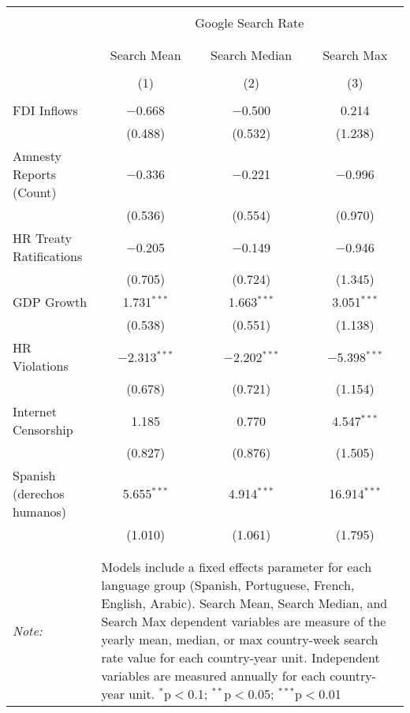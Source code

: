 
\begin{table}[!htbp] \centering 
  \caption{} 
  \label{} 
\begin{tabular}{@{\extracolsep{5pt}}lccc} 
\\[-1.8ex]\hline 
\hline \\[-1.8ex] 
 & \multicolumn{3}{c}{Google Search Rate} \\ 
\cline{2-4} 
\\[-1.8ex] & \multicolumn{3}{c}{ } \\ 
 & Search Mean & Search Median & Search Max \\ 
\\[-1.8ex] & (1) & (2) & (3)\\ 
\hline \\[-1.8ex] 
 FDI Inflows & $-$0.668 & $-$0.500 & 0.214 \\ 
  & (0.488) & (0.532) & (1.238) \\ 
  Amnesty Reports (Count) & $-$0.336 & $-$0.221 & $-$0.996 \\ 
  & (0.536) & (0.554) & (0.970) \\ 
  HR Treaty Ratifications & $-$0.205 & $-$0.149 & $-$0.946 \\ 
  & (0.705) & (0.724) & (1.345) \\ 
  GDP Growth & 1.731$^{***}$ & 1.663$^{***}$ & 3.051$^{***}$ \\ 
  & (0.538) & (0.551) & (1.138) \\ 
  HR Violations & $-$2.313$^{***}$ & $-$2.202$^{***}$ & $-$5.398$^{***}$ \\ 
  & (0.678) & (0.721) & (1.154) \\ 
  Internet Censorship & 1.185 & 0.770 & 4.547$^{***}$ \\ 
  & (0.827) & (0.876) & (1.505) \\ 
  Spanish (derechos humanos) & 5.655$^{***}$ & 4.914$^{***}$ & 16.914$^{***}$ \\ 
  & (1.010) & (1.061) & (1.795) \\ 
 \hline \\[-1.8ex] 
\hline 
\hline \\[-1.8ex] 
\textit{Note:}  & \multicolumn{3}{l}{\parbox[t]{8cm}{Models include a fixed effects parameter for each language group (Spanish, Portuguese, French, English, Arabic). Search Mean, Search Median, and Search Max dependent variables are measure of the yearly mean, median, or max country-week search rate value for each country-year unit. Independent variables are measured annually for each country-year unit. $^{*}$p$<$0.1; $^{**}$p$<$0.05; $^{***}$p$<$0.01}} \\ 
\end{tabular} 
\end{table} 
